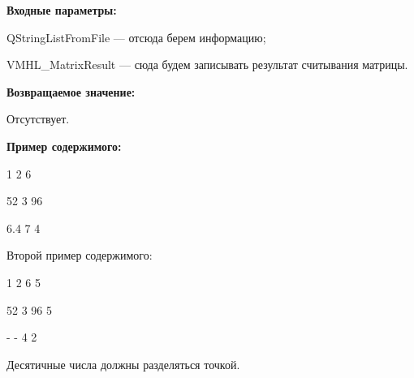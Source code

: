 \textbf{Входные параметры:}

 
QStringListFromFile --- отсюда берем информацию;

VMHL\_MatrixResult --- сюда будем записывать результат считывания матрицы.

\textbf{Возвращаемое значение:}

Отсутствует.

\textbf{Пример содержимого:}

1	2	6

52	3	96

6.4	7	4

    Второй пример содержимого:
	
1	2	6	5

52	3	96	5

-	-	4   2

Десятичные числа должны разделяться точкой.